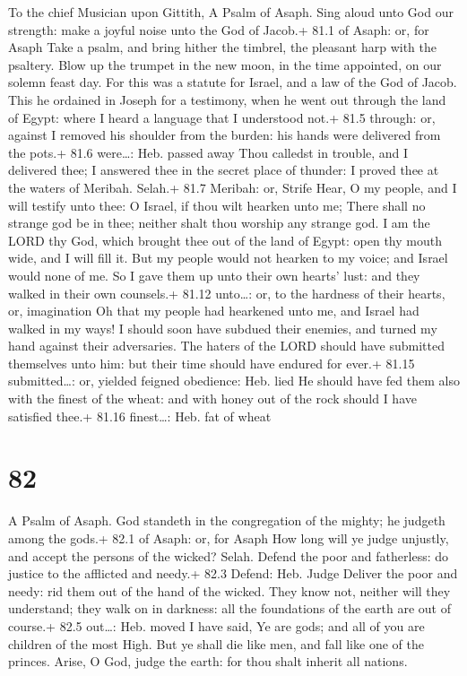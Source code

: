 To the chief Musician upon Gittith, A Psalm of Asaph.  Sing
aloud unto God our strength: make a joyful noise unto the God of Jacob.+
81.1 of Asaph: or, for Asaph  Take a psalm, and bring hither
the timbrel, the pleasant harp with the psaltery.  Blow up
the trumpet in the new moon, in the time appointed, on our solemn feast
day.  For this was a statute for Israel, and a law of the
God of Jacob.  This he ordained in Joseph for a testimony,
when he went out through the land of Egypt: where I heard a language
that I understood not.+ 81.5 through: or, against  I removed
his shoulder from the burden: his hands were delivered from the pots.+
81.6 were\ldots: Heb. passed away  Thou calledst in trouble,
and I delivered thee; I answered thee in the secret place of thunder: I
proved thee at the waters of Meribah. Selah.+ 81.7 Meribah: or, Strife
 Hear, O my people, and I will testify unto thee: O Israel,
if thou wilt hearken unto me;  There shall no strange god be
in thee; neither shalt thou worship any strange god.  I am
the LORD thy God, which brought thee out of the land of Egypt: open thy
mouth wide, and I will fill it.  But my people would not
hearken to my voice; and Israel would none of me.  So I
gave them up unto their own hearts' lust: and they walked in their own
counsels.+ 81.12 unto\ldots: or, to the hardness of their hearts, or,
imagination  Oh that my people had hearkened unto me, and
Israel had walked in my ways!  I should soon have subdued
their enemies, and turned my hand against their adversaries.
 The haters of the LORD should have submitted themselves
unto him: but their time should have endured for ever.+ 81.15
submitted\ldots: or, yielded feigned obedience: Heb. lied 
He should have fed them also with the finest of the wheat: and with
honey out of the rock should I have satisfied thee.+ 81.16 finest\ldots:
Heb. fat of wheat

\hypertarget{section-81}{%
\section{82}\label{section-81}}

A Psalm of Asaph.  God standeth in the congregation of the
mighty; he judgeth among the gods.+ 82.1 of Asaph: or, for Asaph
 How long will ye judge unjustly, and accept the persons of
the wicked? Selah.  Defend the poor and fatherless: do
justice to the afflicted and needy.+ 82.3 Defend: Heb. Judge
 Deliver the poor and needy: rid them out of the hand of the
wicked.  They know not, neither will they understand; they
walk on in darkness: all the foundations of the earth are out of
course.+ 82.5 out\ldots: Heb. moved  I have said, Ye are
gods; and all of you are children of the most High.  But ye
shall die like men, and fall like one of the princes. 
Arise, O God, judge the earth: for thou shalt inherit all nations.


